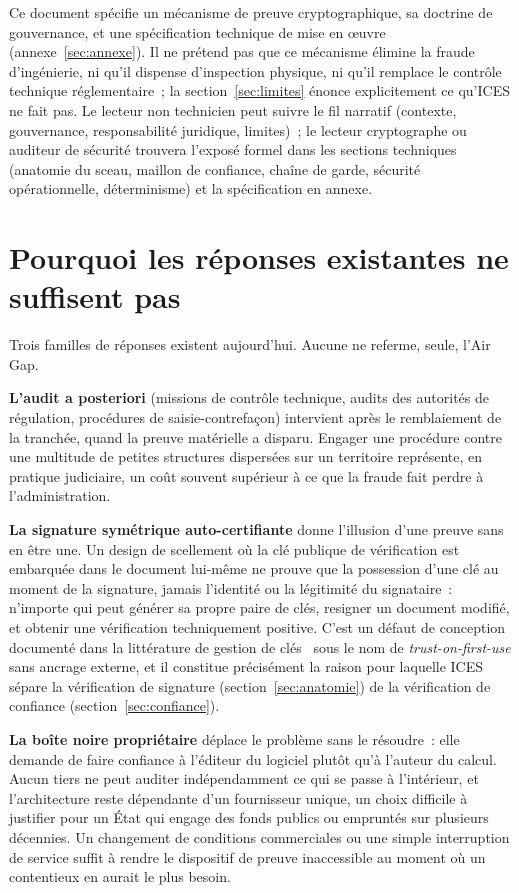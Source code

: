 \documentclass[11pt,a4paper]{article}
\begin{document}
Ce document spécifie un mécanisme de preuve cryptographique, sa doctrine de gouvernance, et une spécification technique de mise en œuvre (annexe~\ref{sec:annexe}). Il ne prétend pas que ce mécanisme élimine la fraude d'ingénierie, ni qu'il dispense d'inspection physique, ni qu'il remplace le contrôle technique réglementaire~; la section~\ref{sec:limites} énonce explicitement ce qu'ICES ne fait pas. Le lecteur non technicien peut suivre le fil narratif (contexte, gouvernance, responsabilité juridique, limites)~; le lecteur cryptographe ou auditeur de sécurité trouvera l'exposé formel dans les sections techniques (anatomie du sceau, maillon de confiance, chaîne de garde, sécurité opérationnelle, déterminisme) et la spécification en annexe.

\section{Pourquoi les réponses existantes ne suffisent pas}\label{sec:reponses}

Trois familles de réponses existent aujourd'hui. Aucune ne referme, seule, l'Air Gap.

\textbf{L'audit a posteriori} (missions de contrôle technique, audits des autorités de régulation, procédures de saisie-contrefaçon) intervient après le remblaiement de la tranchée, quand la preuve matérielle a disparu. Engager une procédure contre une multitude de petites structures dispersées sur un territoire représente, en pratique judiciaire, un coût souvent supérieur à ce que la fraude fait perdre à l'administration.

\textbf{La signature symétrique auto-certifiante} donne l'illusion d'une preuve sans en être une. Un design de scellement où la clé publique de vérification est embarquée dans le document lui-même ne prouve que la possession d'une clé au moment de la signature, jamais l'identité ou la légitimité du signataire~: n'importe qui peut générer sa propre paire de clés, resigner un document modifié, et obtenir une vérification techniquement positive. C'est un défaut de conception documenté dans la littérature de gestion de clés~\cite{nist80057} sous le nom de \emph{trust-on-first-use} sans ancrage externe, et il constitue précisément la raison pour laquelle ICES sépare la vérification de signature (section~\ref{sec:anatomie}) de la vérification de confiance (section~\ref{sec:confiance}).

\textbf{La boîte noire propriétaire} déplace le problème sans le résoudre~: elle demande de faire confiance à l'éditeur du logiciel plutôt qu'à l'auteur du calcul. Aucun tiers ne peut auditer indépendamment ce qui se passe à l'intérieur, et l'architecture reste dépendante d'un fournisseur unique, un choix difficile à justifier pour un État qui engage des fonds publics ou empruntés sur plusieurs décennies. Un changement de conditions commerciales ou une simple interruption de service suffit à rendre le dispositif de preuve inaccessible au moment où un contentieux en aurait le plus besoin.
\end{document}
